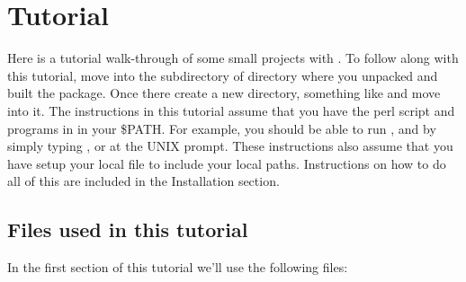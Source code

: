 \section{Tutorial}
\label{section:tutorial}

Here is a tutorial walk-through of some small projects with
. To follow along with this tutorial, move into the
 subdirectory of  directory
where you unpacked and built the  package. Once there
create a new directory, something like  and move
into it. The instructions in this tutorial assume that you have the
 perl script and
 programs in  in your
\$PATH. For example, you should be able to run ,
 and  by simply typing
,  or  at the
UNIX prompt.  These instructions also assume that you have setup your
local  file to include your local
paths. Instructions on how to do all of this are included in the
Installation section.

\subsection{Files used in this tutorial}

In the first section of this tutorial we'll use the following files:

